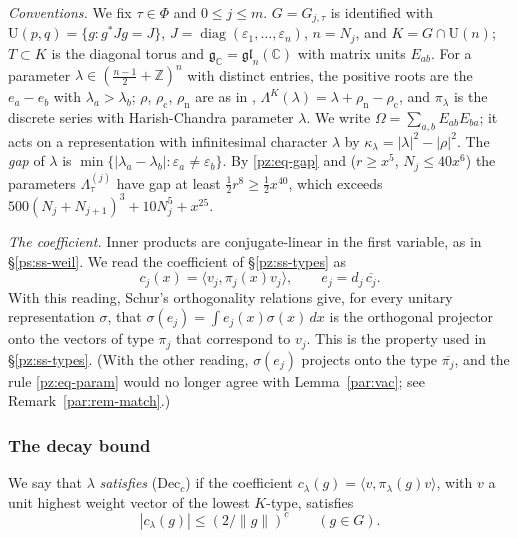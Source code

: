\documentclass[10pt]{amsart}
\theoremstyle{definition}
\theoremstyle{remark}
\newcommand{\C}{\mathbb C}
\newcommand{\Z}{\mathbb Z}
\providecommand{\auPl}{\Phi}
\providecommand{\auU}{\mathrm U}
\begin{document}
\emph{Conventions.} We fix $\tau\in\auPl$ and $0\le j\le m$. $G=G_{j,\tau}$ is identified with
$\auU(p,q)=\{g:g^*Jg=J\}$, $J=\operatorname{diag}(\varepsilon_1,\dots,\varepsilon_n)$, $n=N_j$, and
$K=G\cap\auU(n)$; $T\subset K$ is the diagonal torus and $\mathfrak g_\C=\mathfrak{gl}_n(\C)$ with
matrix units $E_{ab}$. For a parameter $\lambda\in(\tfrac{n-1}2+\Z)^n$ with distinct entries,
the positive roots are the $e_a-e_b$ with $\lambda_a>\lambda_b$; $\rho$, $\rho_{\mathrm c}$,
$\rho_{\mathrm n}$ are as in {\cite[\S5.1]{P51}}, $\Lambda^K(\lambda)=\lambda+\rho_{\mathrm n}-
\rho_{\mathrm c}$, and $\pi_\lambda$ is the discrete series with Harish-Chandra parameter $\lambda$.
We write $\Omega=\sum_{a,b}E_{ab}E_{ba}$; it acts on a representation with infinitesimal character
$\lambda$ by $\kappa_\lambda=|\lambda|^2-|\rho|^2$. The \emph{gap} of $\lambda$ is
$\min\{|\lambda_a-\lambda_b|:\varepsilon_a\ne\varepsilon_b\}$. By \eqref{pz:eq-gap} and
{\cite[\S14.1]{P46}} ($r\ge x^5$, $N_j\le40x^6$) the parameters $\Lambda^{(j)}_\tau$ have gap at
least $\tfrac12r^8\ge\tfrac12x^{40}$, which exceeds $500(N_j+N_{j+1})^3+10N_j^5+x^{25}$.

\emph{The coefficient.} Inner products are conjugate-linear in the first variable, as in
\S\ref{ps:ss-weil}. We read the coefficient of \S\ref{pz:ss-types} as
\begin{equation}\label{par:eq-coef}
c_j(x)=\langle v_j,\pi_j(x)v_j\rangle,\qquad e_j=d_j\,\overline{c_j}.
\end{equation}
With this reading, Schur's orthogonality relations give, for every unitary representation
$\sigma$, that $\sigma(e_j)=\int e_j(x)\sigma(x)\,dx$ is the orthogonal projector onto the vectors
of type $\pi_j$ that correspond to $v_j$. This is the property used in \S\ref{pz:ss-types}. (With
the other reading, $\sigma(e_j)$ projects onto the type $\overline{\pi_j}$, and the rule
\eqref{pz:eq-param} would no longer agree with Lemma~\ref{par:vac}; see Remark~\ref{par:rem-match}.)

\subsubsection{The decay bound}\label{par:ss-decay}
We say that $\lambda$ \emph{satisfies} \textup{(Dec$_c$)} if the coefficient
$c_\lambda(g)=\langle v,\pi_\lambda(g)v\rangle$, with $v$ a unit highest weight vector of the
lowest $K$-type, satisfies
\begin{equation}\label{par:eq-decay}
|c_\lambda(g)|\le(2/\|g\|)^{c}\qquad(g\in G).
\end{equation}
\end{document}
